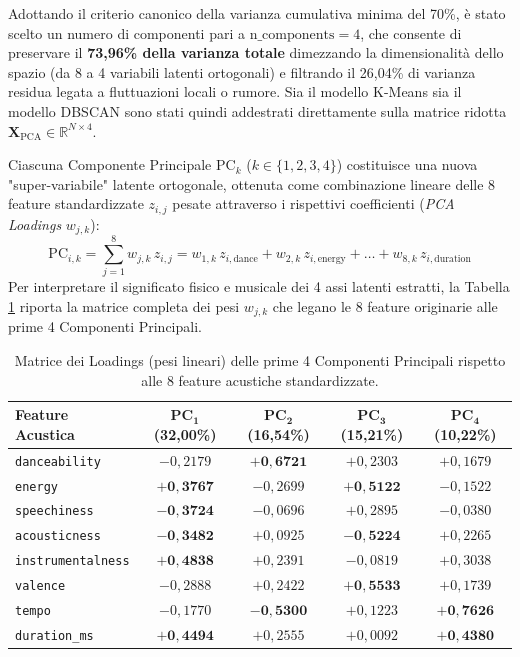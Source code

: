 \documentclass[12pt,a4paper]{article}
\begin{document}
Adottando il criterio canonico della varianza cumulativa minima del 70\%, è stato scelto un numero di componenti pari a \textbf{$\text{n\_components} = 4$}, che consente di preservare il \textbf{73,96\% della varianza totale} dimezzando la dimensionalità dello spazio (da 8 a 4 variabili latenti ortogonali) e filtrando il 26,04\% di varianza residua legata a fluttuazioni locali o rumore. Sia il modello K-Means sia il modello DBSCAN sono stati quindi addestrati direttamente sulla matrice ridotta $\mathbf{X}_{\text{PCA}} \in \mathbb{R}^{N \times 4}$.

Ciascuna Componente Principale $\text{PC}_k$ ($k \in \{1, 2, 3, 4\}$) costituisce una nuova "super-variabile" latente ortogonale, ottenuta come combinazione lineare delle 8 feature standardizzate $z_{i,j}$ pesate attraverso i rispettivi coefficienti (\textit{PCA Loadings} $w_{j,k}$):
\begin{equation}
\boxed{\text{PC}_{i,k} = \sum_{j=1}^{8} w_{j,k} \, z_{i,j} = w_{1,k}\, z_{i,\text{dance}} + w_{2,k}\, z_{i,\text{energy}} + \dots + w_{8,k}\, z_{i,\text{duration}}}
\label{eq:pca_linear_comb}
\end{equation}
Per interpretare il significato fisico e musicale dei 4 assi latenti estratti, la Tabella \ref{tab:pca_loadings} riporta la matrice completa dei pesi $w_{j,k}$ che legano le 8 feature originarie alle prime 4 Componenti Principali.

\begin{table}[H]
\centering
\caption{Matrice dei Loadings (pesi lineari) delle prime 4 Componenti Principali rispetto alle 8 feature acustiche standardizzate.}
\label{tab:pca_loadings}
\vspace{0.2cm}
\begin{tabular}{lcccc}
\toprule
\textbf{Feature Acustica} & $\mathbf{PC_1}$ \textbf{(32,00\%)} & $\mathbf{PC_2}$ \textbf{(16,54\%)} & $\mathbf{PC_3}$ \textbf{(15,21\%)} & $\mathbf{PC_4}$ \textbf{(10,22\%)} \\
\midrule
\texttt{danceability}     & $-0,2179$ & $\mathbf{+0,6721}$ & $+0,2303$ & $+0,1679$ \\
\texttt{energy}           & $\mathbf{+0,3767}$ & $-0,2699$ & $\mathbf{+0,5122}$ & $-0,1522$ \\
\texttt{speechiness}      & $\mathbf{-0,3724}$ & $-0,0696$ & $+0,2895$ & $-0,0380$ \\
\texttt{acousticness}     & $\mathbf{-0,3482}$ & $+0,0925$ & $\mathbf{-0,5224}$ & $+0,2265$ \\
\texttt{instrumentalness} & $\mathbf{+0,4838}$ & $+0,2391$ & $-0,0819$ & $+0,3038$ \\
\texttt{valence}          & $-0,2888$ & $+0,2422$ & $\mathbf{+0,5533}$ & $+0,1739$ \\
\texttt{tempo}            & $-0,1770$ & $\mathbf{-0,5300}$ & $+0,1223$ & $\mathbf{+0,7626}$ \\
\texttt{duration\_ms}     & $\mathbf{+0,4494}$ & $+0,2555$ & $+0,0092$ & $\mathbf{+0,4380}$ \\
\bottomrule
\end{tabular}
\end{table}
\end{document}
